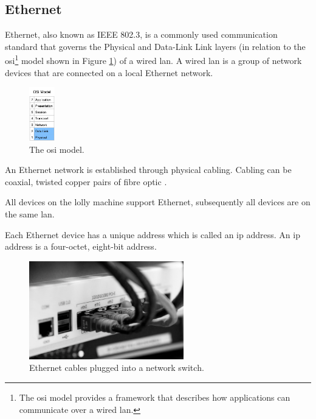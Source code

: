      
\subsection{Ethernet}
    Ethernet, also known as IEEE 802.3, is a commonly used communication standard that governs the Physical and Data-Link Link layers (in relation to the \acrshort{osi}\footnote{The \acrshort{osi} model provides a framework that describes how applications can communicate over a wired \acrshort{lan}\cite{scott2021networking}.} model shown in Figure \ref{fig:osi}) of a wired \acrshort{lan}\cite{scott2021networking}. A wired \acrfull{lan} is a group of network devices that are connected on a local Ethernet network.  
    
        \begin{figure}[H]
            \centering
            \includegraphics[width = 0.1\textwidth]{2_images/osi.png}
            \caption{The \acrshort{osi} model\cite{scott2021networking}.}
            \label{fig:osi}
        \end{figure} 
    
    An Ethernet network is established through physical cabling. Cabling can be coaxial, twisted copper pairs of fibre optic \cite{scott2021networking}.
    
    All devices on the lolly machine support Ethernet, subsequently all devices are on the same \acrshort{lan}.
    
    Each Ethernet device has a unique address which is called an \acrshort{ip} address. An \acrshort{ip} address is a four-octet, eight-bit address\cite{scott2021networking}.  
    
        \begin{figure}[H]
            \centering
            \includegraphics[width = 0.6\textwidth]{2_images/ethernetCables.png}
            \caption{Ethernet cables plugged into a network switch\cite{scott2021networking}.}
            \label{fig:ethenetCables}
        \end{figure} 
        
